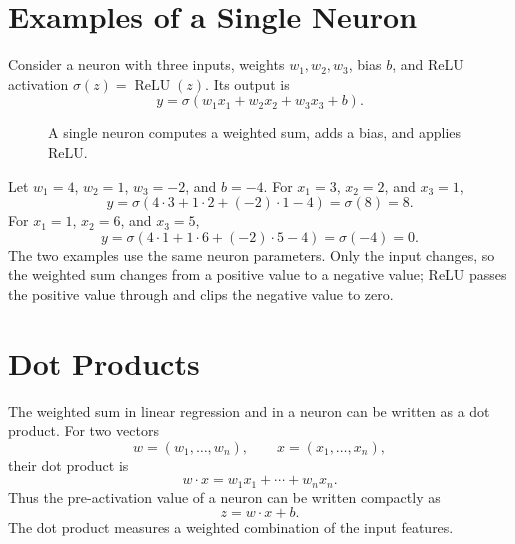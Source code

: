 \documentclass[11pt,openany,oneside]{book}
\begin{document}



\section{Examples of a Single Neuron}

Consider a neuron with three inputs, weights $w_1,w_2,w_3$, bias $b$, and ReLU
activation $\sigma(z)=\operatorname{ReLU}(z)$. Its output is
\[
    y = \sigma(w_1x_1 + w_2x_2 + w_3x_3 + b).
\]

\begin{figure}[h]
\centering
{}
\caption{A single neuron computes a weighted sum, adds a bias, and applies ReLU.}
\end{figure}

Let $w_1=4$, $w_2=1$, $w_3=-2$, and $b=-4$. For
$x_1=3$, $x_2=2$, and $x_3=1$,
\[
    y = \sigma(4 \cdot 3 + 1 \cdot 2 + (-2) \cdot 1 - 4)
      = \sigma(8) = 8.
\]
For $x_1=1$, $x_2=6$, and $x_3=5$,
\[
    y = \sigma(4 \cdot 1 + 1 \cdot 6 + (-2) \cdot 5 - 4)
      = \sigma(-4) = 0.
\]
The two examples use the same neuron parameters. Only the input changes, so the
weighted sum changes from a positive value to a negative value; ReLU passes the
positive value through and clips the negative value to zero.

\section{Dot Products}

The weighted sum in linear regression and in a neuron can be written as a dot
product. For two vectors
\[
    w = (w_1,\ldots,w_n), \qquad x = (x_1,\ldots,x_n),
\]
their dot product is
\[
    w \cdot x = w_1x_1 + \cdots + w_nx_n.
\]
Thus the pre-activation value of a neuron can be written compactly as
\[
    z = w \cdot x + b.
\]
The dot product measures a weighted combination of the input features.
\end{document}

